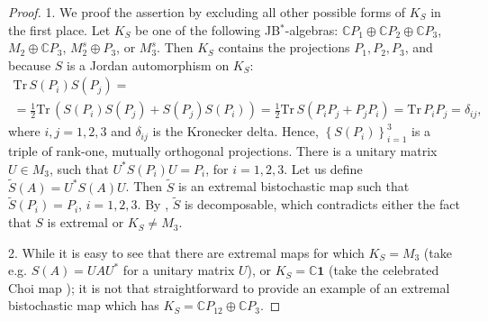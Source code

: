 \documentclass[12pt]{article}
\theoremstyle{plain}
\theoremstyle{definition}
\theoremstyle{remark}
\numberwithin{equation}{section}
\begin{document}
\begin{proof}
1. We proof the assertion by excluding all other possible forms of
$K_{S}$ in the first place.
Let $K_{S}$ be one of the following JB$^{*}$-algebras:
$\mathbb{C} P_{1} \oplus \mathbb{C} P_{2} \oplus \mathbb{C} P_{3}$,
$M_{2} \oplus \mathbb{C} P_{3}$,
$M_{2}^{s} \oplus P_{3}$, or $M_{3}^{s}$.
Then $K_{S}$ contains the projections $P_{1}, P_{2}, P_{3}$,
and because $S$ is a Jordan automorphism on $K_{S}$:
\begin{multline}
    \text{Tr} \, S(P_{i}) S(P_{j}) = \\
= \frac{1}{2} \text{Tr} \, \left( S(P_{i}) S(P_{j}) + S(P_{j}) S(P_{i}) \right)=
\frac{1}{2} \text{Tr} \, S(P_{i} P_{j} + P_{j} P_{i})=
\text{Tr} \, P_{i} P_{j} = \delta_{ij},
\end{multline}
where $i,j = 1,2,3$ and $\delta_{ij}$ is the Kronecker delta.  
Hence, $\left\{S(P_{i})\right\}_{i=1}^{3}$ 
is a triple of rank-one, mutually orthogonal projections.
There is a unitary matrix $U \in M_{3}$, such that
$U^{*} S(P_{i}) U = P_{i}$, for $i = 1,2,3$. 
Let us define $\tilde{S}(A) = U^{*} S(A) U$.
Then $\tilde{S}$ is an extremal 
\cite[Lemma 3.1.2b, p.\,27]{stormer2013positive}
bistochastic map such that
$\tilde{S}(P_{i}) = P_{i}$, $i = 1,2,3$.
By \cite[Theorem 4.1]{kye1995positive},
$\tilde{S}$ is decomposable,
which contradicts either the fact that $S$ is extremal
or $K_{S} \neq M_{3}$.

2.
While it is easy to see that there are extremal maps for which
$K_{S}=M_{3}$ (take e.g. $S(A) = U A U^{*}$ for a unitary matrix $U$),
or $K_{S}=\mathbb{C} \mathbf{1}$
(take the celebrated Choi map
\cite{choi1977extremal});
it is not that straightforward to provide an example of
an extremal bistochastic map which has
$K_{S}= \mathbb{C} P_{12} \oplus \mathbb{C} P_{3}$.


\end{proof}
\end{document}
